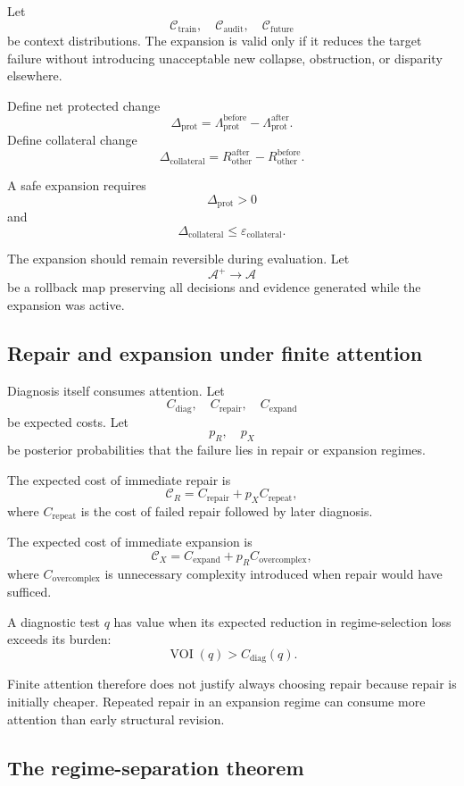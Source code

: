 \documentclass[11pt]{article}
\theoremstyle{definition}
\newcommand{\eps}{\varepsilon}
\begin{document}
Let
\[
\mathcal C_{\mathrm{train}},
\quad
\mathcal C_{\mathrm{audit}},
\quad
\mathcal C_{\mathrm{future}}
\]
be context distributions. The expansion is valid only if it reduces the target failure without introducing unacceptable new collapse, obstruction, or disparity elsewhere.

Define net protected change
\[
\Delta_{\mathrm{prot}}
=
\Lambda_{\mathrm{prot}}^{\mathrm{before}}
-
\Lambda_{\mathrm{prot}}^{\mathrm{after}}.
\]
Define collateral change
\[
\Delta_{\mathrm{collateral}}
=
R_{\mathrm{other}}^{\mathrm{after}}
-
R_{\mathrm{other}}^{\mathrm{before}}.
\]

A safe expansion requires
\[
\Delta_{\mathrm{prot}}>0
\]
and
\[
\Delta_{\mathrm{collateral}}
\leq
\eps_{\mathrm{collateral}}.
\]

The expansion should remain reversible during evaluation. Let
\[
\mathcal A^{+}
\to
\mathcal A
\]
be a rollback map preserving all decisions and evidence generated while the expansion was active.

\subsection{Repair and expansion under finite attention}

Diagnosis itself consumes attention. Let
\[
C_{\mathrm{diag}},
\quad
C_{\mathrm{repair}},
\quad
C_{\mathrm{expand}}
\]
be expected costs. Let
\[
p_R,
\quad
p_X
\]
be posterior probabilities that the failure lies in repair or expansion regimes.

The expected cost of immediate repair is
\[
\mathcal C_R
=
C_{\mathrm{repair}}
+
p_X C_{\mathrm{repeat}},
\]
where \(C_{\mathrm{repeat}}\) is the cost of failed repair followed by later diagnosis.

The expected cost of immediate expansion is
\[
\mathcal C_X
=
C_{\mathrm{expand}}
+
p_R C_{\mathrm{overcomplex}},
\]
where \(C_{\mathrm{overcomplex}}\) is unnecessary complexity introduced when repair would have sufficed.

A diagnostic test \(q\) has value when its expected reduction in regime-selection loss exceeds its burden:
\[
\operatorname{VOI}(q)
>
C_{\mathrm{diag}}(q).
\]

Finite attention therefore does not justify always choosing repair because repair is initially cheaper. Repeated repair in an expansion regime can consume more attention than early structural revision.

\subsection{The regime-separation theorem}
\end{document}
